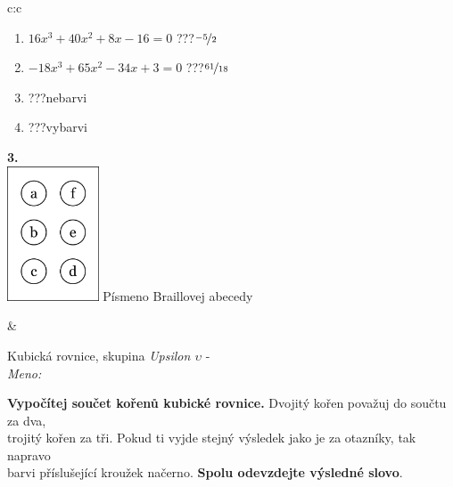 \documentclass[10pt]{report}
\begin{document}
\begin{tabular}{c:c}
\begin{minipage}[c][104.5mm][t]{0.5\linewidth}
\begin{center}
\begin{minipage}{0.79\linewidth}
\begin{center}
\begin{varwidth}{\linewidth}
\begin{enumerate}
\item $16x^3+40x^2+8x-16=0$\quad \dotfill\; ???\;\dotfill \quad $\nicefrac{-5}{2}$
\item $-18x^3+65x^2-34x+3=0$\quad \dotfill\; ???\;\dotfill \quad $\nicefrac{61}{18}$
\item \quad \dotfill\; ???\;\dotfill \quad nebarvi
\item \quad \dotfill\; ???\;\dotfill \quad vybarvi
\end{enumerate}
\end{varwidth}
\end{center}
\end{minipage}
\begin{minipage}{0.20\linewidth}
\begin{center}
{\Huge\bfseries 3.} \\[2mm]
\includegraphics[height=40mm]{../images/braille.png}
{\small Písmeno Braillovej abecedy}
\end{center}
\end{minipage}
\end{center}
\end{minipage}
&
\begin{minipage}[c][104.5mm][t]{0.5\linewidth}
\begin{center}
\vspace{7mm}
{\huge Kubická rovnice, skupina \textit{Upsilon $\upsilon$} -}\\[5mm]
\textit{Meno:}\phantom{xxxxxxxxxxxxxxxxxxxxxxxxxxxxxxxxxxxxxxxxxxxxxxxxxxxxxxxxxxxxxxxxx}\\[5mm]
\begin{minipage}{0.95\linewidth}
\textbf{Vypočítej součet kořenů kubické rovnice.} Dvojitý kořen považuj do součtu za dva,\\trojitý kořen za tři. Pokud ti vyjde stejný výsledek jako je za otazníky, tak napravo\\barvi příslušející kroužek načerno. \textbf{Spolu odevzdejte výsledné slovo}.
\end{minipage}
\\[1mm]
\begin{minipage}{0.79\linewidth}

\end{minipage}
\end{center}
\end{minipage}
\end{tabular}
\end{document}
